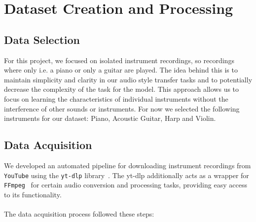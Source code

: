 \section{Dataset Creation and Processing}

\subsection{Data Selection}
For this project, we focused on isolated instrument recordings, so recordings where only i.e. a piano or only a guitar are played.
The idea behind this is to maintain simplicity and clarity in our audio style transfer tasks and to potentially decrease the complexity of the task for the model.
This approach allows us to focus on learning the characteristics of individual instruments without the interference of other sounds or instruments.
For now we selected the following instruments for our dataset: Piano, Acoustic Guitar, Harp and Violin.


\subsection{Data Acquisition}
\label{sec:data_acquisition}
We developed an automated pipeline for downloading instrument recordings from \texttt{YouTube} using the \texttt{yt-dlp} library~\cite{youtube,yt-dlp}.
The yt-dlp additionally acts as a wrapper for \texttt{FFmpeg}~\cite{ffmpeg} for certain audio conversion and processing tasks, providing easy access to its functionality.
\\\\
The data acquisition process followed these steps:

